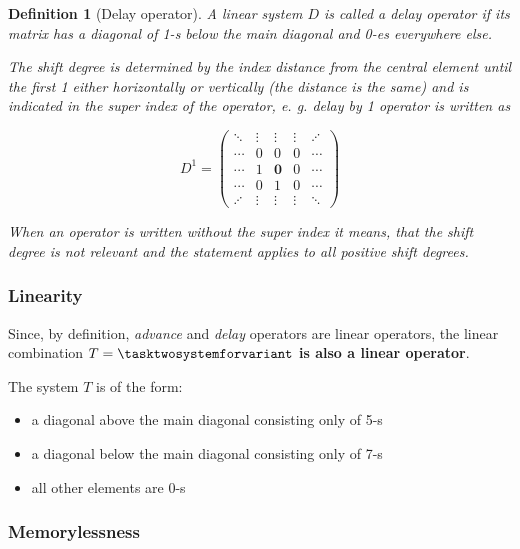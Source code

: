 \documentclass[a4paper]{article}
\theoremstyle{break}
\newtheorem{definition}{Definition}[section]
\theoremstyle{break}
\begin{document}
\begin{definition}[Delay operator]
  A linear system $D$ is called a \textit{delay} operator if its matrix has a diagonal of 1-s below the main diagonal and 0-es everywhere else.

  The shift degree is determined by the index distance from the central element until the first 1 either horizontally or vertically (the distance is the same) and is indicated in the super index of the operator, e. g. delay by 1 operator is written as

  \begin{equation*}
    D^{1} = \begin{pmatrix*}
          \ddots  & \vdots & \vdots         & \vdots & \iddots \\
          \cdots  & 0      & 0              & 0      & \cdots \\
          \cdots  & 1      & \boldsymbol{0} & 0      & \cdots \\
          \cdots  & 0      & 1              & 0      & \cdots \\
          \iddots & \vdots & \vdots         & \vdots & \ddots
        \end{pmatrix*}
  \end{equation*}

  When an operator is written without the super index it means, that the shift degree is not relevant and the statement applies to all positive shift degrees.
\end{definition}

\subsubsection*{Linearity} \label{sssec:task-two-linearity}

Since, by definition, \textit{advance} and \textit{delay} operators are linear operators, the linear combination $T = \tasktwosystemforvariant$ \textbf{is also a linear operator}.

The system $T$ is of the form:

\begin{itemize}
  \item a diagonal above the main diagonal consisting only of 5-s
  \item a diagonal below the main diagonal consisting only of 7-s
  \item all other elements are 0-s
\end{itemize}

\subsubsection*{Memorylessness}
\end{document}

